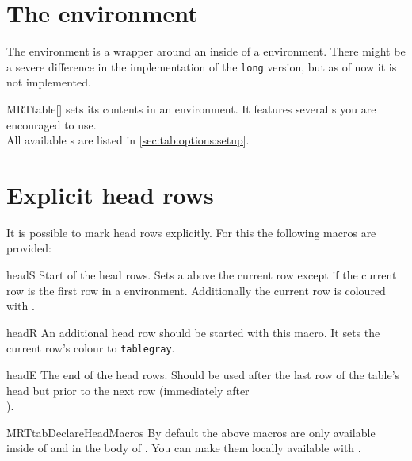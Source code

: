 \section{The  environment}\label{sec:tab:table}%
The  environment is a wrapper around an  inside of
a  environment. There might be a severe difference in the
implementation of the \texttt{long} version, but as of now it is not
implemented.

\begin{describeenv}{MRTtable}[]
   sets its contents in an  environment. It
  features several s you are encouraged to use.
  \\[\parskip]
  All available s are listed in \autoref{sec:tab:options:setup}.
\end{describeenv}

\section{Explicit head rows}\label{sec:tab:explicit}%
It is possible to mark head rows explicitly. For this the following macros are
provided:

\begin{describemacro}{headS}%
  Start of the head rows. Sets a  above the current row except if the
  current row is the first row in a  environment. Additionally
  the current row is coloured with .
\end{describemacro}%

\begin{describemacro}{headR}%
  An additional head row should be started with this macro. It sets the current
  row's colour to \texttt{tablegray}.
\end{describemacro}%

\begin{describemacro}{headE}%
  The end of the head rows. Should be used after the last row of the table's
  head but prior to the next row (immediately after \texttt{\string\\}).
\end{describemacro}%

\begin{describemacro}{MRTtabDeclareHeadMacros}%
  By default the above macros are only available inside of  and
  in the body of . You can make them locally available with
  .
\end{describemacro}%

